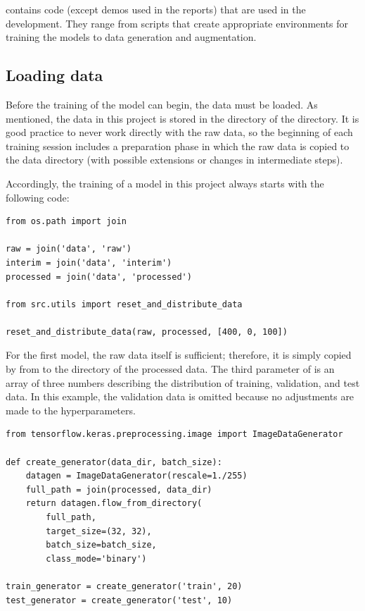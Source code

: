  contains code (except demos used in the reports) that are used in the development. They range from scripts that create appropriate environments for training the models to data generation and augmentation.

\subsection{Loading data}

Before the training of the model can begin, the data must be loaded.
As mentioned, the data in this project is stored in the  directory of the  directory.
It is good practice to never work directly with the raw data, so the beginning of each training session includes a preparation phase in which the raw data is copied to the  data directory (with possible extensions or changes in intermediate steps).

Accordingly, the training of a model in this project always starts with the following code:

\begin{lstlisting}
from os.path import join

raw = join('data', 'raw')
interim = join('data', 'interim')
processed = join('data', 'processed')
    
from src.utils import reset_and_distribute_data
    
reset_and_distribute_data(raw, processed, [400, 0, 100])
\end{lstlisting}

For the first model, the raw data itself is sufficient; therefore, it is simply copied by  from  to the directory of the processed data.
The third parameter of  is an array of three numbers describing the distribution of training, validation, and test data.
In this example, the validation data is omitted because no adjustments are made to the hyperparameters.

\begin{lstlisting}
from tensorflow.keras.preprocessing.image import ImageDataGenerator

def create_generator(data_dir, batch_size):
    datagen = ImageDataGenerator(rescale=1./255)
    full_path = join(processed, data_dir)
    return datagen.flow_from_directory(
        full_path,
        target_size=(32, 32),
        batch_size=batch_size,
        class_mode='binary')

train_generator = create_generator('train', 20)
test_generator = create_generator('test', 10)
\end{lstlisting}

